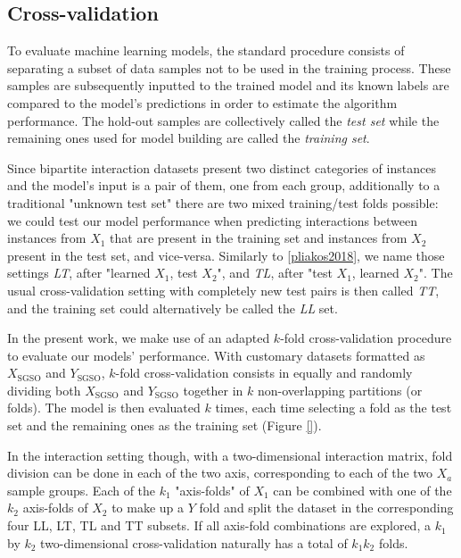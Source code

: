 \subsection{Cross-validation}
\label{sec:cross_validation}

To evaluate machine learning models, the standard procedure consists of separating a subset of data samples not to be used in the training process. These samples are subsequently inputted to the trained model and its known labels are compared to the model's predictions in order to estimate the algorithm performance. The hold-out samples are collectively called the \emph{test set} while the remaining ones used for model building are called the \emph{training set}.

Since bipartite interaction datasets present two distinct categories of instances and the model's input is a pair of them, one from each group, additionally to a traditional "unknown test set" there are two mixed training/test folds possible: we could test our model performance when predicting interactions between instances from $X_1$ that are present in the training set and instances from $X_2$ present in the test set, and vice-versa. Similarly to \ref{pliakos2018}, %
we name those settings \emph{LT}, after "learned $X_1$, test $X_2$", and \emph{TL}, after "test $X_1$, learned $X_2$". The usual cross-validation setting with completely new test pairs is then called \emph{TT}, and the training set could alternatively be called the \emph{LL} set.

In the present work, we make use of an adapted $k$-fold cross-validation procedure to evaluate our models' performance. With customary datasets formatted as $X_\text{SGSO}$ and $Y_\text{SGSO}$, $k$-fold cross-validation consists in equally and randomly dividing both $X_\text{SGSO}$ and $Y_\text{SGSO}$ together in $k$ non-overlapping partitions (or folds). The model is then evaluated $k$ times, each time selecting a fold as the test set and the remaining ones as the training set (Figure \ref{}).

In the interaction setting though, with a two-dimensional interaction matrix, fold division can be done in each of the two axis, corresponding to each of the two $X_a$ sample groups. Each of the $k_1$ "axis-folds" of $X_1$ can be combined with one of the $k_2$ axis-folds of $X_2$ to make up a $Y$ fold and split the dataset in the corresponding four LL, LT, TL and TT subsets. If all axis-fold combinations are explored, a $k_1$ by $k_2$ two-dimensional cross-validation naturally has a total of $k_1k_2$ folds. 

